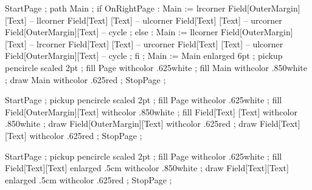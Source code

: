 \stopbuffer


\startbuffer[pagetext]
\subject{Edward  R. Tufte}         \par
\subject{Donald  E. Knuth}         \par
\subject{Douglas R. Hostadter}   \page
\stopbuffer

\startbuffer[back-0]
\setupbackgrounds[page][background=page]
\stopbuffer

\startbuffer[back-1]
  StartPage ;
    path Main ;
    if OnRightPage :
      Main := lrcorner Field[OuterMargin][Text] --
              llcorner Field[Text]       [Text] --
              ulcorner Field[Text]       [Text] --
              urcorner Field[OuterMargin][Text] -- cycle ;
    else :
      Main := llcorner Field[OuterMargin][Text] --
              lrcorner Field[Text]       [Text] --
              urcorner Field[Text]       [Text] --
              ulcorner Field[OuterMargin][Text] -- cycle ;
    fi ;
    Main := Main enlarged 6pt ;
    pickup pencircle scaled 2pt ;
    fill Page withcolor .625white ;
    fill Main withcolor .850white ;
    draw Main withcolor .625red ;
  StopPage ;
\stopuseMPgraphic
\stopbuffer

\startbuffer[back-2]
  StartPage ;
    pickup pencircle scaled 2pt ;
    fill Page                     withcolor .625white ;
    fill Field[OuterMargin][Text] withcolor .850white ;
    fill Field[Text]       [Text] withcolor .850white ;
    draw Field[OuterMargin][Text] withcolor .625red ;
    draw Field[Text]       [Text] withcolor .625red ;
  StopPage ;
\stopuseMPgraphic
\stopbuffer

\startbuffer[back-3]
  StartPage ;
    pickup pencircle scaled 2pt ;
    fill Page                            withcolor .625white ;
    fill Field[Text][Text] enlarged .5cm withcolor .850white ;
    draw Field[Text][Text] enlarged .5cm withcolor .625red ;
  StopPage ;
\stopuseMPgraphic
\stopbuffer

